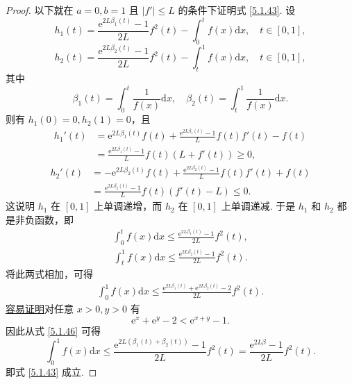 \documentclass[../../main.tex]{subfiles}
\begin{document}
\begin{proof}
以下就在 $a = 0, b = 1$ 且 $|f'| \leqslant L$ 的条件下证明式 \eqref{5.1.43}. 设
$$h_1(t) = \frac{\mathrm{e}^{2L\beta_1(t)} - 1}{2L} f^2(t) - \int_0^t f(x) \mathrm{d}x, \quad t \in [0,1],$$
$$h_2(t) = \frac{\mathrm{e}^{2L\beta_2(t)} - 1}{2L} f^2(t) - \int_t^1 f(x) \mathrm{d}x, \quad t \in [0,1],$$
其中
$$\beta_1(t) = \int_0^t \frac{1}{f(x)} \mathrm{d}x, \quad \beta_2(t) = \int_t^1 \frac{1}{f(x)} \mathrm{d}x.$$
则有 $h_1(0) = 0, h_2(1) = 0$，且
$$
\begin{aligned}
h_1'(t) &= \mathrm{e}^{2L\beta_1(t)} f(t) + \frac{\mathrm{e}^{2L\beta_1(t)} - 1}{L} f(t) f'(t) - f(t) \\
&= \frac{\mathrm{e}^{2L\beta_1(t)} - 1}{L} f(t) (L + f'(t)) \geqslant 0,
\end{aligned}
$$
$$
\begin{aligned}
h_2'(t) &= -\mathrm{e}^{2L\beta_2(t)} f(t) + \frac{\mathrm{e}^{2L\beta_2(t)} - 1}{L} f(t) f'(t) + f(t) \\
&= \frac{\mathrm{e}^{2L\beta_2(t)} - 1}{L} f(t) (f'(t) - L) \leqslant 0.
\end{aligned}
$$
这说明 $h_1$ 在 $[0,1]$ 上单调递增，而 $h_2$ 在 $[0,1]$ 上单调递减. 于是 $h_1$ 和 $h_2$ 都是非负函数，即
\begin{align}
\int_0^t f(x) \mathrm{d}x \leqslant \frac{\mathrm{e}^{2L\beta_1(t)} - 1}{2L} f^2(t), \label{5.1.44}
\end{align}
\begin{align}
\int_t^1 f(x) \mathrm{d}x \leqslant \frac{\mathrm{e}^{2L\beta_2(t)} - 1}{2L} f^2(t). \label{5.1.45}
\end{align}
将此两式相加，可得
\begin{align}
\int_0^1 f(x) \mathrm{d}x \leqslant \frac{\mathrm{e}^{2L\beta_1(t)} + \mathrm{e}^{2L\beta_2(t)} - 2}{2L} f^2(t). \label{5.1.46}
\end{align}
\hyperref[proposition:常用不等式3]{容易证明}对任意 $x > 0, y > 0$ 有
$$\mathrm{e}^x + \mathrm{e}^y - 2 < \mathrm{e}^{x + y} - 1.$$
因此从式 \eqref{5.1.46} 可得
$$\int_0^1 f(x) \mathrm{d}x \leqslant \frac{\mathrm{e}^{2L(\beta_1(t) + \beta_2(t))} - 1}{2L} f^2(t) = \frac{\mathrm{e}^{2L\beta} - 1}{2L} f^2(t).$$
即式 \eqref{5.1.43} 成立.
\end{proof}
\end{document}
